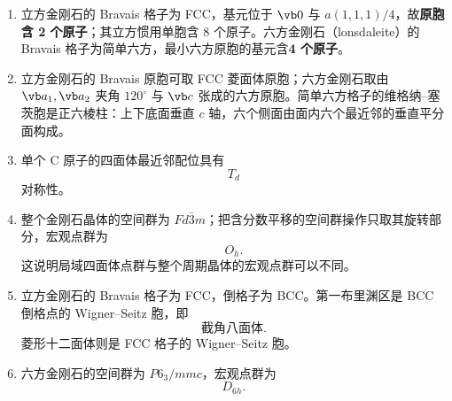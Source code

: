 \begin{question}[15 分]
\begin{solution}
\begin{enumerate}
  \item 立方金刚石的 Bravais 格子为 FCC，基元位于
  $\vb0$ 与 $a(1,1,1)/4$，故\textbf{原胞含 2 个原子}；其立方惯用单胞含 8 个原子。六方金刚石（lonsdaleite）的 Bravais 格子为简单六方，最小六方原胞的基元含\textbf{4 个原子}。
  \item 立方金刚石的 Bravais 原胞可取 FCC 菱面体原胞；六方金刚石取由
  $\vb a_1,\vb a_2$ 夹角 $120^\circ$ 与 $\vb c$ 张成的六方原胞。简单六方格子的维格纳--塞茨胞是正六棱柱：上下底面垂直 $c$ 轴，六个侧面由面内六个最近邻的垂直平分面构成。
  \item 单个 C 原子的四面体最近邻配位具有
  \[
    \boxed{T_d}
  \]
  对称性。
  \item 整个金刚石晶体的空间群为 $Fd\bar3m$；把含分数平移的空间群操作只取其旋转部分，宏观点群为
  \[
    \boxed{O_h.}
  \]
  这说明局域四面体点群与整个周期晶体的宏观点群可以不同。
  \item 立方金刚石的 Bravais 格子为 FCC，倒格子为 BCC。第一布里渊区是 BCC 倒格点的 Wigner--Seitz 胞，即
  \[
    \boxed{\text{截角八面体}.}
  \]
  菱形十二面体则是 FCC 格子的 Wigner--Seitz 胞。
  \item 六方金刚石的空间群为 $P6_3/mmc$，宏观点群为
  \[
    \boxed{D_{6h}.}
  \]
\end{enumerate}
\end{solution}
\end{question}


